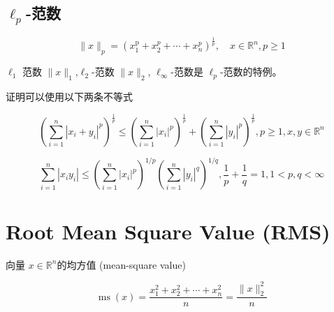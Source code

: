\subsection{$ \ell_{p} $-范数}

\begin{definition}
    \begin{equation} \|x\|_{p}=\left(x_{1}^{\mathrm{p}}+x_{2}^{p}+\cdots+x_{n}^{p}\right)^{\frac{1}{p}}, \quad x \in \mathbb{R}^{n}, p \ge 1 \end{equation}

    $ \ell_{1} $ 范数 $ \|x\|_{1}$,$ \ell_{2} $-范数 $ \|x\|_{2} $, $ \ell_{\infty} $-范数是 $ \ell_{p} $-范数的特例。 
\end{definition}

证明可以使用以下两条不等式

\begin{theorem}
    \begin{equation} \left(\sum_{i=1}^{n}\left|x_{i}+y_{i}\right|^{p}\right)^{\frac{1}{p}} \leq\left(\sum_{i=1}^{n}\left|x_{i}\right|^{p}\right)^{\frac{1}{p}}+\left(\sum_{i=1}^{n}\left|y_{i}\right|^{p}\right)^{\frac{1}{p}}, p \geq 1, x, y \in \mathbb{R}^{n} \end{equation}
\end{theorem}

\begin{theorem}
    \begin{equation} \sum_{i=1}^{n}\left|x_{i} y_{i}\right| \leq\left(\sum_{i=1}^{n}\left|x_{i}\right|^{p}\right)^{1 / p}\left(\sum_{i=1}^{n}\left|y_{i}\right|^{q}\right)^{1 / q}, \frac{1}{p}+\frac{1}{q}=1,1<p, q<\infty \end{equation}
\end{theorem}

\section{Root Mean Square Value (RMS)}

\begin{definition}
    向量 $ x \in \mathbb{R}^n $的均方值 (mean-square value)

    \begin{equation}\operatorname{ms}(x) = \frac{x_{1}^{2}+x_{2}^{2}+\cdots+x_{n}^{2}}{n}=\frac{\|x\|_{2}^{2}}{n} \end{equation}
\end{definition}

